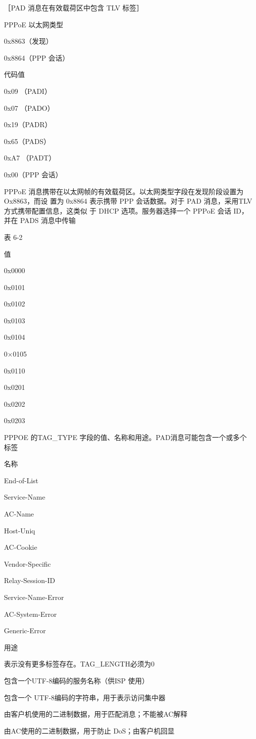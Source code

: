 ［PAD 消息在有效载荷区中包含 TLV 标签］

PPPoE 以太网类型

0x8863（发现）

0x8864（PPP 会话）

代码值

0x09 （PADI）

0x07 （PADO）

0x19（PADR）

0x65（PADS）

0xA7 （PADT）

0x00（PPP 会话）

PPPoE 消息携带在以太网帧的有效载荷区。以太网类型字段在发现阶段设置为Ox8863，而设
置为 0x8864 表示携带 PPP 会话数据。对于 PAD 消息，采用TLV 方式携带配置信息，这类似
于 DHCP 选项。服务器选择一个 PPPoE 会话 ID，并在 PADS 消息中传输

表 6-2

值

0x0000

0x0101

0x0102

0x0103

0x0104

0×0105

0x0110

0x0201

0x0202

0x0203

PPPOE 的TAG\_TYPE 字段的值、名称和用途。PAD消息可能包含一个或多个标签

名称

End-of-List

Service-Name

AC-Name

Host-Uniq

AC-Cookie

Vendor-Specific

Relay-Session-ID

Service-Name-Error

AC-System-Error

Generic-Error

用途

表示没有更多标签存在。TAG\_LENGTH必须为0

包含一个UTF-8编码的服务名称（供ISP 使用）

包含一个 UTF-8编码的字符串，用于表示访问集中器

由客户机使用的二进制数据，用于匹配消息；不能被AC解释

由AC使用的二进制数据，用于防止 DoS；由客户机回显

